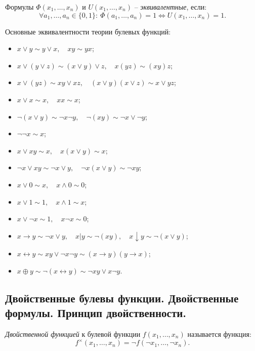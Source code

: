 \begin{definition}
    Формулы $\Phi(x_1,\ldots,x_n)$ и $U(x_1,\ldots,x_n)$ -- \emph{эквивалентные}, если:
    \[
        \forall a_1,\ldots,a_n \in \{0,1\}: \ \Phi(a_1,\ldots,a_n) = 1 \iff U(x_1,\ldots,x_n) = 1.
    \]

    Основные эквивалентности теории булевых функций:
    \begin{itemize}
        \item $x \lor y \sim y \lor x, \quad xy \sim yx$;
        \item $x \lor (y\lor z) \sim (x \lor y) \lor z, \quad x(yz) \sim (xy)z$;
        \item $x \lor (yz) \sim xy \lor xz, \quad (x\lor y)(x\lor z) \sim x \lor yz$;
        \item $x \lor x \sim x, \quad xx \sim x$;
        \item $\lnot(x \lor y) \sim \lnot x\lnot y, \quad \lnot(xy) \sim \lnot x \lor \lnot y$;
        \item $\lnot\lnot x \sim x$;
        \item $x \lor xy \sim x, \quad x(x\lor y)\sim x$;
        \item $\lnot x \lor xy \sim \lnot x\lor y, \quad \lnot x(x \lor y)\sim \lnot xy$;
        \item $x \lor 0 \sim x, \quad x \land 0 \sim 0$;
        \item $x \lor 1 \sim 1, \quad x \land 1 \sim x$;
        \item $x \lor \lnot x \sim 1, \quad x\lnot x \sim 0$;
        \item $x \rightarrow y \sim \lnot x \lor y, \quad x \vert y \sim \lnot(xy), \quad x \downarrow y \sim \lnot(x \lor y)$;
        \item $x \leftrightarrow y \sim xy \lor \lnot x \lnot y \sim (x\rightarrow y)(y\rightarrow x)$;
        \item $x \oplus y \sim \lnot(x \leftrightarrow y) \sim \lnot x y \lor x \lnot y$.
    \end{itemize}
\end{definition}

\subsection{Двойственные булевы функции. Двойственные формулы. Принцип двойственности.}

\begin{definition}
    \emph{Двойственной функцией} к булевой функции $f(x_1,\ldots,x_n)$ называется функция:
    \[
        f^\times(x_1,\ldots,x_n) = \lnot f(\lnot x_1,\ldots, \lnot x_n).
    \]
\end{definition}

